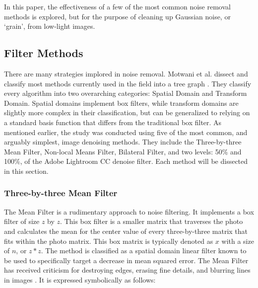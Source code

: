 \documentclass{ncjms}
\begin{document}

In this paper, the effectiveness of a few of the most common noise removal methods is explored, but for the purpose of cleaning up Gaussian noise, or `grain', from low-light images.

\subsection{Filter Methods}
There are many strategies implored in noise removal. Motwani et al. dissect and classify most methods currently used in the field into a tree graph \citep{Mukesh}. They classify every algorithm into two overarching categories: Spatial Domain and Transform Domain. Spatial domains implement box filters, while transform domains are slightly more complex in their classification, but can be generalized to relying on a standard basis function that differs from the traditional box filter. As mentioned earlier, the study was conducted using five of the most common, and arguably simplest, image denoising methods. They include the Three-by-three Mean Filter, Non-local Means Filter, Bilateral Filter, and two levels: 50\% and 100\%, of the Adobe Lightroom CC denoise filter. Each method will be dissected in this section.

\subsubsection{Three-by-three Mean Filter}
The Mean Filter is a rudimentary approach to noise filtering. It implements a box filter of size $z$ by $z$. This box filter is a smaller matrix that traverses the photo and calculates the mean for the center value of every three-by-three matrix that fits within the photo matrix. This box matrix is typically denoted as $x$ with a size of $n$, or $z*z$. The method is classified as a spatial domain linear filter known to be used to specifically target a decrease in mean squared error. The Mean Filter has received criticism for destroying edges, erasing fine details, and blurring lines in images \citep{Mukesh}. It is expressed symbolically as follows:
\end{document}
